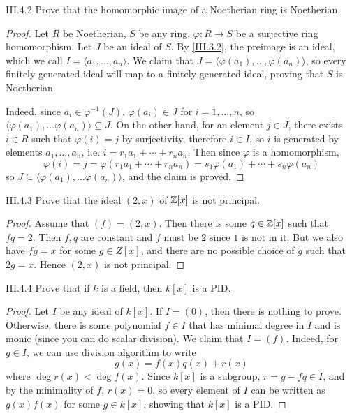 \begin{problem}{III.4.2}
Prove that the homomorphic image of a Noetherian ring is Noetherian.
\end{problem}
\begin{proof}
Let $R$ be Noetherian, $S$ be any ring, $\varphi:R \to S$ be a surjective ring homomorphism. Let $J$ be an ideal of $S$. By \ref{III.3.2}, the preimage is an ideal, which we call $I = \langle a_1, \dotsc,  a_n \rangle$. We claim that $J = \langle \varphi(a_1), \dotsc, \varphi(a_n) \rangle$, so every finitely generated ideal will map to a finitely generated ideal, proving that $S$ is Noetherian. 

Indeed, since $a_i \in \varphi^{-1}(J)$, $\varphi(a_i) \in J$ for $i = 1,\dotsc,n$, so $\langle \varphi(a_1), \dotsc \varphi(a_n) \rangle \subseteq J$. On the other hand, for an element $j \in J$, there exists $i \in R$ such that $\varphi(i) = j$ by surjectivity, therefore $i \in I$, so $i$ is generated by elements $a_1, \dotsc ,a_n$, i.e. $i = r_1a_1 + \cdots + r_na_n$. Then since $\varphi$ is a homomorphism, 
\[
\varphi(i) = j = \varphi(r_1a_1 + \cdots + r_na_n) = s_1\varphi(a_1) + \cdots + s_n\varphi(a_n)
\]
so $J \subseteq \langle \varphi(a_1), \dotsc \varphi(a_n) \rangle$, and the claim is proved.
\end{proof}

\begin{problem}{III.4.3}
Prove that the ideal $(2,x)$ of $\mathbb{Z}[x]$ is not principal. 
\end{problem}
\begin{proof}
Assume that $(f) = (2,x)$. Then there is some $q \in \mathbb{Z}[x]$ such that $fq = 2$. Then $f,q$ are constant and $f$ must be $2$ since $1$ is not in it. But we also have $fg = x$ for some $g \in Z[x]$, and there are no possible choice of $g$ such that $2g = x$. Hence $(2,x)$ is not principal.
\end{proof}

\begin{problem}{III.4.4}
Prove that if $k$ is a field, then $k[x]$ is a PID.
\end{problem}
\begin{proof}
Let $I$ be any ideal of $k[x]$. If $I = (0)$, then there is nothing to prove. Otherwise, there is some polynomial $f\in I$ that has minimal degree in $I$ and is monic (since you can do scalar division). We claim that $I = (f)$. Indeed, for $g \in I$, we can use division algorithm to write
\[
g(x) = f(x)q(x) + r(x)  
\]  
where $\deg r(x) < \deg f(x)$. Since $k[x]$ is a subgroup, $r = g - fq \in I$, and by the minimality of $f$, $r(x) = 0$, so every element of $I$ can be written as $g(x)f(x)$ for some $g \in k[x]$, showing that $k[x]$ is a PID.
\end{proof}


